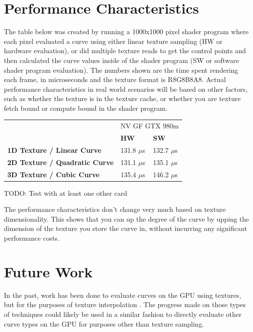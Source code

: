 \documentclass{jcgt}
\begin{document}
\section{Performance Characteristics}
\label{sec:performancecharacteristics}

The table below was created by running a 1000x1000 pixel shader program where each pixel evaluated a curve using either linear texture sampling (HW or hardware evaluation), or did multiple texture reads to get the control points and then calculated the curve values inside of the shader program (SW or software shader program evaluation).  The numbers shown are the time spent rendering each frame, in microseconds and the texture format is R8G8B8A8.  Actual performance characteristics in real world scenarios will be based on other factors, such as whether the texture is in the texture cache, or whether you are texture fetch bound or compute bound in the shader program.

\begin{tabular}{|l|l l|}
\hline
& \multicolumn{2}{|c|}{NV GF GTX 980m} \\
& \bf{HW} & \bf{SW}\\ \hline
\bf{1D Texture / Linear Curve} & 131.8 $\mu$s & 132.7 $\mu$s \\ \hline
\bf{2D Texture / Quadratic Curve} & 131.1 $\mu$s & 135.1 $\mu$s \\ \hline
\bf{3D Texture / Cubic Curve} & 135.4 $\mu$s & 146.2 $\mu$s \\ \hline
\end{tabular}

TODO: Test with at least one other card

The performance characteristics don't change very much based on texture dimensionality. This shows that you can up the degree of the curve by upping the dimension of the texture you store the curve in, without incurring any significant performance costs.

\section*{Future Work}
\label{sec:futurework}

In the past, work has been done to evaluate curves on the GPU using textures, but for the purposes of texture interpolation \cite{doi:10.1080/2151237X.2008.10129269}.  The progress made on those types of techniques could likely be used in a similar fashion to directly evaluate other curve types on the GPU for purposes other than texture sampling.
\end{document}
